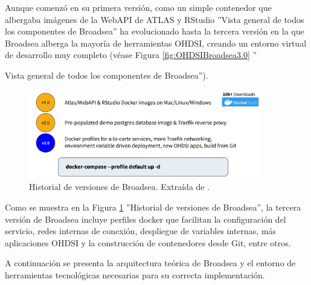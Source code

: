 Aunque comenzó en su primera versión, como un simple contenedor que albergaba imágenes de la WebAPI de ATLAS y RStudio \cite{Broadsea3PPTX} ''Vista general de todos los componentes de Broadsea'' ha evolucionado hasta la tercera versión en la que Broadsea alberga la mayoría de herramientas OHDSI, creando un entorno virtual de desarrollo muy completo (véase Figura \ref{fig:OHDSIBroadsea3.0} ''{Vista general de todos los componentes de Broadsea''). 

\begin{figure}[H]
    \centering
    \includegraphics[width=0.90\textwidth]{figures/versionesBroadsea.png}
    \caption{Historial de versiones de Broadsea. Extraída de \cite{Broadsea3PPTX}.}
    \label{fig:versionesBroadsea}
\end{figure}

Como se muestra en la Figura \ref{fig:versionesBroadsea} ''Historial de versiones de Broadsea'', la tercera versión de Broadsea incluye perfiles docker que facilitan la configuración del servicio, redes internas de conexión, despliegue de variables internas, más aplicaciones OHDSI y la construcción de contenedores desde Git, entre otros. 

A continuación se presenta la arquitectura teórica de Broadsea y el entorno de herramientas tecnológicas necesarias para su correcta implementación.




}
